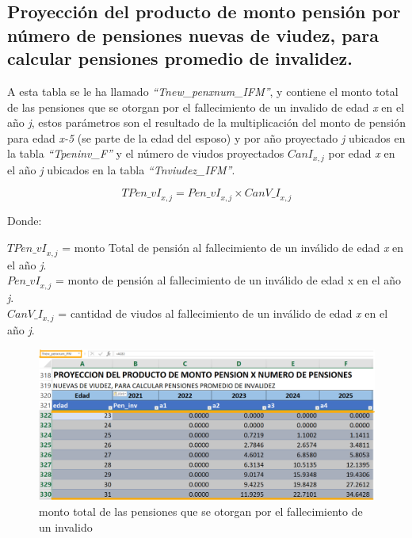 \documentclass[
  letterpaper,
  DIV=11,
  numbers=noendperiod]{scrreprt}
\begin{document}
\hypertarget{proyecciuxf3n-del-producto-de-monto-pensiuxf3n-por-nuxfamero-de-pensiones-nuevas-de-viudez-para-calcular-pensiones-promedio-de-invalidez.}{%
\subsection{Proyección del producto de monto pensión por número de
pensiones nuevas de viudez, para calcular pensiones promedio de
invalidez.}\label{proyecciuxf3n-del-producto-de-monto-pensiuxf3n-por-nuxfamero-de-pensiones-nuevas-de-viudez-para-calcular-pensiones-promedio-de-invalidez.}}

A esta tabla se le ha llamado \emph{``Tnew\_penxnum\_IFM''}, y contiene
el monto total de las pensiones que se otorgan por el fallecimiento de
un invalido de edad \emph{x} en el año \emph{j}, estos parámetros son el
resultado de la multiplicación del monto de pensión para edad \emph{x-5}
(se parte de la edad del esposo) y por año proyectado \emph{j} ubicados
en la tabla \emph{``Tpeninv\_F''} y el número de viudos proyectados
\(CanI_{x,j}\) por edad \emph{x} en el año \emph{j} ubicados en la tabla
\emph{``Tnviudez\_IFM''}.

\begin{equation}
{TPen\_vI}_{x,j}={Pen\_vI}_{x,j}\times{CanV\_I}_{x,j}
\end{equation}

Donde:

\({TPen\_vI}_{x,j}\) = monto Total de pensión al fallecimiento de un
inválido de edad \emph{x} en el año \emph{j}.\\
\({Pen\_vI}_{x,j}\) = monto de pensión al fallecimiento de un inválido
de edad x en el año \emph{j}.\\
\(Can{V\_I}_{x,j}\) = cantidad de viudos al fallecimiento de un inválido
de edad \emph{x} en el año \emph{j}.

\begin{figure}

{\centering \includegraphics{images/F/Img39.png}

}

\caption{monto total de las pensiones que se otorgan por el
fallecimiento de un invalido}

\end{figure}
\end{document}
